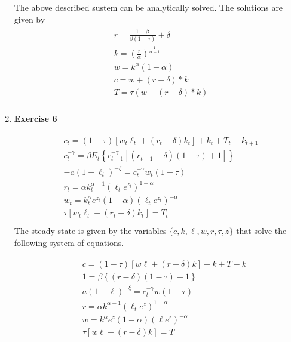 \documentclass[12pt, letterpaper,bibtotoc, tablecaptionabove, figurecaptionabove]{article}
\begin{document}
\begin{enumerate}
The above described sustem can be analytically solved. The solutions are given by
\begin{eqnarray*}
\begin{aligned}
&r=\frac{1-\beta}{\beta(1-\tau)}+\delta\\
&k=\left(\frac{r}{\alpha}\right)^{\frac{1}{\alpha-1}}\\
&w=k^\alpha(1-\alpha)\\
&c=w+(r-\delta)*k\\
&T=\tau(w+(r-\delta)*k)\\
\end{aligned}
\end{eqnarray*}




\item{\bf{Exercise 6}}

\begin{eqnarray*}
\begin{aligned}
&c_{t}=(1-\tau)\left[w_{t} \ell_{t}+\left(r_{t}-\delta\right) k_{t}\right]+k_{t}+T_{t}-k_{t+1}\\
&c_t^{-\gamma}=\beta E_{t}\left\{c_{t+1}^{-\gamma}\left[\left(r_{t+1}-\delta\right)(1-\tau)+1\right]\right\}\\
&-a(1-\ell_t)^{-\xi}=c_t^{-\gamma} w_{t}(1-\tau)\\
&r_t=\alpha k_t^{\alpha-1}(\ell_t e^{z_t})^{1-\alpha} \\
& w_t=k_t^\alpha e^{z_t}(1-\alpha)(\ell_t e^{z_t})^{-\alpha}\\ 
&{\tau\left[w_{t} \ell_{t}+\left(r_{t}-\delta\right) k_{t}\right]=T_{t}} \\ 
\end{aligned}
\end{eqnarray*}
The steady state is given by the variables $\{c,k,\ell,w,r,\tau,z\}$ that solve the following system of equations.

\begin{eqnarray*}
\begin{aligned}
&c=(1-\tau)\left[w\ell+\left(r-\delta\right) k\right]+k+T-k\\
&1=\beta \left\{\left(r-\delta\right)(1-\tau)+1\right\}\\
-&a(1-\ell)^{-\xi}=c_t^{-\gamma} w(1-\tau)\\
&r=\alpha k^{\alpha-1}(\ell_t e^{z})^{1-\alpha} \\
 &w=k^\alpha e^{z}(1-\alpha)(\ell e^{z})^{-\alpha}\\ 
&{\tau\left[w \ell+\left(r-\delta\right) k\right]=T} \\ 
\end{aligned}
\end{eqnarray*}



\end{enumerate}
\end{document}

